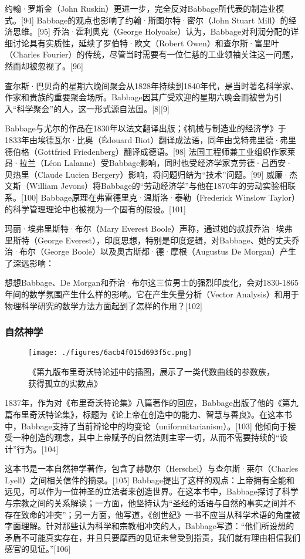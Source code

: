 约翰·罗斯金（John Ruskin）更进一步，完全反对Babbage所代表的制造业模式。[94] Babbage的观点也影响了约翰·斯图尔特·密尔（John Stuart Mill）的经济思维。[95] 乔治·霍利奥克（George Holyoake）认为，Babbage对利润分配的详细讨论具有实质性，延续了罗伯特·欧文（Robert Owen）和查尔斯·富里叶（Charles Fourier）的传统，尽管当时需要有一位仁慈的工业领袖关注这一问题，然而却被忽视了。[96]

查尔斯·巴贝奇的星期六晚间聚会从1828年持续到1840年代，是当时著名科学家、作家和贵族的重要聚会场所。Babbage因其广受欢迎的星期六晚会而被誉为引入“科学聚会”的人，这一形式源自法国。[8][9]

Babbage与尤尔的作品在1830年以法文翻译出版；《机械与制造业的经济学》于1833年由埃德瓦尔·比奥（Édouard Biot）翻译成法语，同年由戈特弗里德·弗里德伯格（Gottfried Friedenberg）翻译成德语。[98] 法国工程师兼工业组织作家莱昂·拉兰（Léon Lalanne）受Babbage影响，同时也受经济学家克劳德·吕西安·贝热里（Claude Lucien Bergery）影响，将问题归结为“技术”问题。[99] 威廉·杰文斯（William Jevons）将Babbage的“劳动经济学”与他在1870年的劳动实验相联系。[100] Babbage原理在弗雷德里克·温斯洛·泰勒（Frederick Winslow Taylor）的科学管理理论中也被视为一个固有的假设。[101]

玛丽·埃弗里斯特·布尔（Mary Everest Boole）声称，通过她的叔叔乔治·埃弗里斯特（George Everest），印度思想，特别是印度逻辑，对Babbage、她的丈夫乔治·布尔（George Boole）以及奥古斯都·德·摩根（Augustus De Morgan）产生了深远影响：

想想Babbage、De Morgan和乔治·布尔这三位男士的强烈印度化，会对1830-1865年间的数学氛围产生什么样的影响。它在产生矢量分析（Vector Analysis）和用于物理科学研究的数学方法方面起到了怎样的作用？[102]
\subsubsection{自然神学}
\begin{figure}[ht]
\centering
\texttt{[image: ./figures/6acb4f015d693f5c.png]}
\caption{《第九版布里奇沃特论述中的插图，展示了一类代数曲线的参数族，获得孤立的实数点》} \label{fig_CRSBQ_3}
\end{figure}
1837年，作为对《布里奇沃特论集》八篇著作的回应，Babbage出版了他的《第九篇布里奇沃特论集》，标题为《论上帝在创造中的能力、智慧与善良》。在这本书中，Babbage支持了当前辩论中的均变论（uniformitarianism）。[103] 他倾向于接受一种创造的观念，其中上帝赋予的自然法则主宰一切，从而不需要持续的“设计”行为。[104]

这本书是一本自然神学著作，包含了赫歇尔（Herschel）与查尔斯·莱尔（Charles Lyell）之间相关信件的摘录。[105] Babbage提出了这样的观点：上帝拥有全能和远见，可以作为一位神圣的立法者来创造世界。在这本书中，Babbage探讨了科学与宗教之间的关系解读；一方面，他坚持认为“圣经的话语与自然的事实之间并不存在致命的冲突”；另一方面，他写道，《创世纪》一书不应当从科学术语的角度被字面理解。针对那些认为科学和宗教相冲突的人，Babbage写道：“他们所设想的矛盾不可能真实存在，并且只要摩西的见证未曾受到指责，我们就有理由相信我们感官的见证。”[106]


